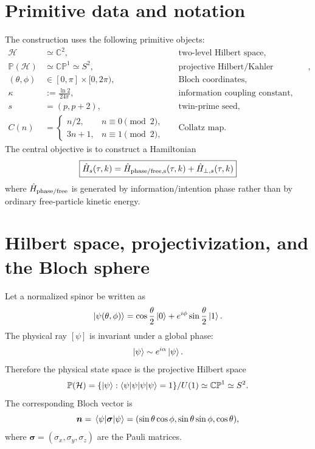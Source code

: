 \documentclass[11pt,a4paper]{article}
\begin{document}
\section{Primitive data and notation}
The construction uses the following primitive objects:
\begin{align}
\mathcal H &\simeq \mathbb C^2, &&\text{two-level Hilbert space},\\
\mathbb P(\mathcal H) &\simeq \mathbb{CP}^{1} \simeq S^2, &&\text{projective Hilbert/Kahler manifold},\\
(\theta,\phi)&\in[0,\pi]\times[0,2\pi), &&\text{Bloch coordinates},\\
\kappa&:=\frac{\ln 2}{24\pi}, &&\text{information coupling constant},\\
s&=(p,p+2), &&\text{twin-prime seed},\\
C(n)&=\begin{cases}n/2,&n\equiv0\pmod 2,\\3n+1,&n\equiv1\pmod 2,\end{cases} &&\text{Collatz map}.
\end{align}
The central objective is to construct a Hamiltonian
\begin{equation}
\boxed{\hat H_s(\tau,k)=\hat H_{\rm phase/free,s}(\tau,k)+\hat H_{\perp,s}(\tau,k)}
\end{equation}
where $\hat H_{\rm phase/free}$ is generated by information/intention phase rather than by ordinary free-particle kinetic energy.

\section{Hilbert space, projectivization, and the Bloch sphere}
Let a normalized spinor be written as
\begin{equation}
\ket{\psi(\theta,\phi)}=\cos\frac{\theta}{2}\ket{0}+e^{i\phi}\sin\frac{\theta}{2}\ket{1}.
\end{equation}
The physical ray $[\psi]$ is invariant under a global phase:
\begin{equation}
\ket{\psi}\sim e^{i\alpha}\ket{\psi}.
\end{equation}
Therefore the physical state space is the projective Hilbert space
\begin{equation}
\mathbb P(\mathcal H)=\{\ket{\psi}:\braket{\psi|\psi}=1\}/U(1)\simeq \mathbb{CP}^{1}\simeq S^2.
\end{equation}
The corresponding Bloch vector is
\begin{equation}
\bm n=\mel{\psi}{\bm\sigma}{\psi}=(\sin\theta\cos\phi,\sin\theta\sin\phi,\cos\theta),
\end{equation}
where $\bm\sigma=(\sigma_x,\sigma_y,\sigma_z)$ are the Pauli matrices.
\end{document}
